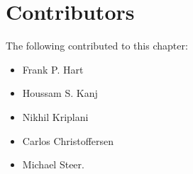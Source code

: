 \section{Contributors}
The following contributed to this chapter:
\begin{itemize}
\item[] Frank P. Hart
\item[] Houssam S. Kanj
\item[] Nikhil Kriplani
\item[] Carlos Christoffersen
\item[] Michael Steer.
\end{itemize}

